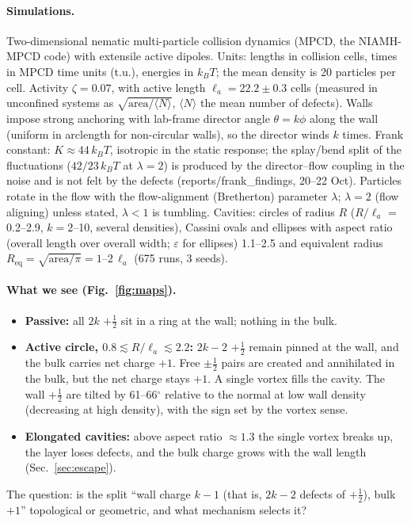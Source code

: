 \documentclass[11pt,a4paper]{article}
\newcommand{\half}{\tfrac12}
\newcommand{\la}{\ell_a}
\newcommand{\kT}{k_BT}
\begin{document}
\paragraph{Simulations.} Two-dimensional nematic multi-particle collision dynamics (MPCD, the NIAMH-MPCD code) with extensile active dipoles. Units: lengths in collision
cells, times in MPCD time units (t.u.), energies in $\kT$; the mean density is 20 particles per cell. Activity $\zeta=0.07$, with active length $\la=22.2\pm0.3$ cells
(measured in unconfined systems as $\sqrt{\text{area}/\langle N\rangle}$, $\langle N\rangle$ the mean number of defects). Walls impose strong anchoring with lab-frame
director angle $\theta=k\phi$ along the wall (uniform in arclength for non-circular walls), so the director winds $k$ times. Frank constant: $K\approx44\,\kT$, isotropic in the static response; the splay/bend split of the
fluctuations ($42/23\,\kT$ at $\lambda=2$) is produced by the director--flow coupling in the noise and is not felt by the defects (reports/frank\_findings, 20--22 Oct). Particles rotate in the flow with the flow-alignment (Bretherton) parameter $\lambda$; $\lambda=2$ (flow aligning) unless
stated, $\lambda<1$ is tumbling. Cavities: circles of radius $R$ ($R/\la$ = 0.2--2.9, $k=2$--10, several densities), Cassini ovals and ellipses with aspect ratio
(overall length over overall width; $\varepsilon$ for ellipses) 1.1--2.5 and equivalent radius $R_\mathrm{eq}=\sqrt{\text{area}/\pi}=1$--$2\,\la$ (675 runs, 3 seeds).

\paragraph{What we see (Fig.~\ref{fig:maps}).}
\begin{itemize}
  \item \textbf{Passive:} all $2k$ $+\half$ sit in a ring at the wall; nothing in the bulk.
  \item \textbf{Active circle, $0.8\lesssim R/\la\lesssim2.2$:} $2k-2$ $+\half$ remain pinned at the wall, and the bulk carries net charge $+1$. Free $\pm\half$
        pairs are created and annihilated in the bulk, but the net charge stays $+1$. A single vortex fills the cavity. The wall $+\half$ are tilted by
        61--66$^\circ$ relative to the normal at low wall density (decreasing at high density), with the sign set by the vortex sense.
  \item \textbf{Elongated cavities:} above aspect ratio $\approx1.3$ the single vortex breaks up, the layer loses defects, and the bulk charge grows with the wall length (Sec.~\ref{sec:escape}).
\end{itemize}
The question: is the split ``wall charge $k-1$ (that is, $2k-2$ defects of $+\half$), bulk $+1$'' topological or geometric, and what mechanism selects it?
\end{document}

